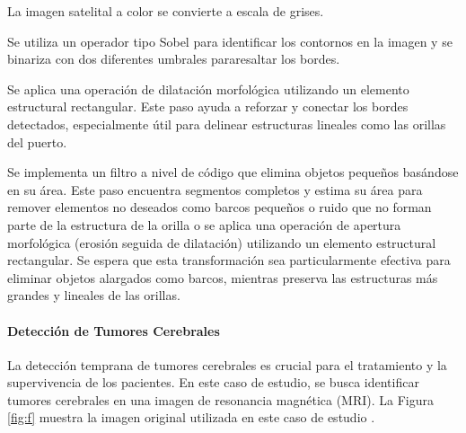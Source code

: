 \begin{seriate}

    \item La imagen satelital a color se convierte a escala de grises. 
    
    \item Se utiliza un operador tipo Sobel para identificar los contornos en la imagen y se binariza con dos diferentes umbrales pararesaltar los bordes.

    \item Se aplica una operación de dilatación morfológica utilizando un elemento estructural rectangular. Este paso ayuda a reforzar y conectar los bordes detectados, especialmente útil para delinear estructuras lineales como las orillas del puerto.
    
    \item Se implementa un filtro a nivel de código que elimina objetos pequeños basándose en su área. Este paso encuentra segmentos completos y estima su área para remover elementos no deseados como barcos pequeños o ruido que no forman parte de la estructura de la orilla o se aplica una operación de apertura morfológica (erosión seguida de dilatación) utilizando un elemento estructural rectangular. Se espera que esta transformación sea particularmente efectiva para eliminar objetos alargados como barcos, mientras preserva las estructuras más grandes y lineales de las orillas.
    
    \end{seriate}

\paragraph{Detección de Tumores Cerebrales} La detección temprana de tumores cerebrales es crucial para el tratamiento y la supervivencia de los pacientes. En este caso de estudio, se busca identificar tumores cerebrales en una imagen de resonancia magnética (MRI). La Figura \ref{fig:f} muestra la imagen original utilizada en este caso de estudio \autocite{BrainMRIImages}.


